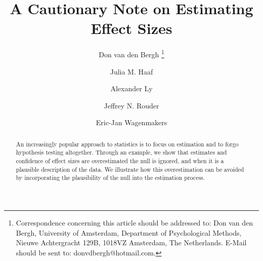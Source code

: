 \documentclass[a4paper]{article}
\title{A Cautionary Note on Estimating Effect Sizes}
\author[1]{Don van den Bergh%
	\thanks{Correspondence concerning this article should be addressed to: Don van den Bergh, University of Amsterdam, Department of Psychological Methods, Nieuwe Achtergracht 129B, 1018VZ Amsterdam, The Netherlands. E-Mail should be sent to: donvdbergh@hotmail.com.
}}
\author[1]{Julia M. Haaf}
\author[1,2]{Alexander Ly}
\author[3]{\authorcr Jeffrey N. Rouder} %
\author[1]{Eric-Jan Wagenmakers}
\affil[1]{University of Amsterdam}
\affil[2]{Centrum Wiskunde \& Informatica}
\affil[3]{University of California Irvine}
\date{}
\begin{document}


\maketitle

\begin{abstract}
	An increasingly popular approach to statistics is to focus on estimation and to forgo hypothesis testing altogether. Through an example, we show that estimates and confidence of effect sizes are overestimated the null is ignored, and when it is a plausible description of the data. We illustrate how this overestimation can be avoided by incorporating the plausibility of the null into the estimation process.
\end{abstract}
\end{document}
